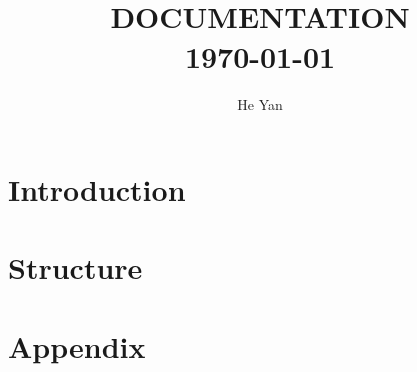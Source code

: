


\title{
        \HRule{2pt}\\
        \LARGE \textbf{\uppercase{Documentation}}
        \HRule{2pt} \\ [0.5cm]
        \normalsize \today \vspace*{5\baselineskip}}

\date{}

\author{He Yan}

\maketitle
\tableofcontents
\setcounter{page}{0}
\thispagestyle{empty}
\newpage

\section*{Introduction}

\section{Structure}

\begin{center}

\end{center}

\newpage
\section*{Appendix}



